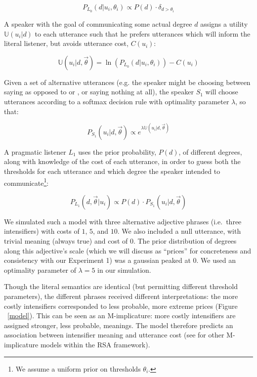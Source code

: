 \begin{appendices}
$$P_{L_0}(d|u_i, \theta_i) \propto P(d) \cdot \delta_{d > \theta_i}$$

A speaker with the goal of communicating some actual degree $d$ assigns a utility $\mathbb{U}(u_i|d)$ to each utterance such that he prefers utterances which will inform the literal listener, but avoids utterance cost, $C(u_i)$:

$$\mathbb{U}(u_i | d, \vec{\theta}) =  \ln\left(P_{L_0}(d | u_i, \theta_i) \right) - C(u_i) $$

Given a set of alternative utterances (e.g. the speaker might be choosing between saying  as opposed to  or , or saying nothing at all), the speaker $S_1$ will choose utterances according to a softmax decision rule \cite{sutton_reinforcement_2011} with optimality parameter $\lambda$, so that:

$$ P_{S_1}(u_i | d, \vec{\theta}) \propto e^{\lambda \mathbb{U}(u_i | d, \vec{\theta})} $$

A pragmatic listener $L_1$ uses the prior probability, $P(d)$, of different degrees, along with knowledge of the cost of each utterance, in order to guess both the thresholds for each utterance and which degree the speaker intended to communicate\footnote{We assume a uniform prior on thresholds $\theta_i$.}:

$$ P_{L_1}(d, \vec{\theta} | u_i) \propto P(d) \cdot P_{S_1}(u_i | d, \vec{\theta}) $$

We simulated such a model with three alternative adjective phrases (i.e.~three intensifiers) with costs of $1$, $5$, and $10$. We also included a null utterance, with trivial meaning (always true) and cost of $0$. The prior distribution of degrees along this adjective's scale (which we will discuss as ``prices'' for concreteness and consistency with our Experiment 1) was a gaussian peaked at $0$.
We used an optimality parameter of $\lambda=5$ in our simulation. 

Though the literal semantics are identical (but permitting different threshold parameters), the different phrases received different interpretations: the more costly intensifiers corresponded to less probable, more extreme prices (Figure ~\ref{model}).
This can be seen as an M-implicature: more costly intensifiers are assigned stronger, less probable, meanings. 
The model therefore predicts an association between intensifier meaning and utterance cost (see \citet{bergen_pragmatic_2014} for other M-implicature models within the RSA framework).



\end{appendices}
